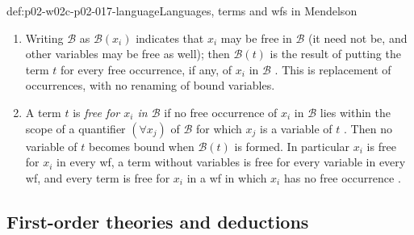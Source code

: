 \begin{hbdefinition}{def:p02-w02c-p02-017-language}{Languages, terms and wfs in Mendelson}
\begin{enumerate}
  \item Writing \(\mathscr B\) as \(\mathscr B(x_i)\) indicates that
        \(x_i\) may be free in \(\mathscr B\) (it need not be, and other
        variables may be free as well); then \(\mathscr B(t)\) is the result
        of putting the term \(t\) for every free occurrence, if any, of
        \(x_i\) in \(\mathscr B\) \cite[\S 2.1, p.~54]{Mendelson1997}.  This
        is replacement of occurrences, with no renaming of bound variables.
  \item A term \(t\) is \emph{free for \(x_i\) in \(\mathscr B\)} if no free
        occurrence of \(x_i\) in \(\mathscr B\) lies within the scope of a
        quantifier \((\forall x_j)\) of \(\mathscr B\) for which \(x_j\) is a
        variable of \(t\) \cite[\S 2.1, p.~54]{Mendelson1997}.  Then no
        variable of \(t\) becomes bound when \(\mathscr B(t)\) is formed.  In
        particular \(x_i\) is free for \(x_i\) in every wf, a term without
        variables is free for every variable in every wf, and every term is
        free for \(x_i\) in a wf in which \(x_i\) has no free occurrence
        \cite[\S 2.1, p.~54]{Mendelson1997}.
\end{enumerate}
\end{hbdefinition}

\subsection{First-order theories and deductions}
\label{sec:p02-w02c-p02-017-theories}

